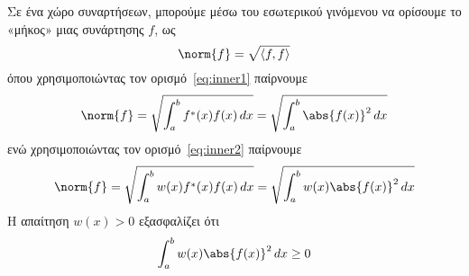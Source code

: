 \begin{rem}
  Σε ένα χώρο συναρτήσεων, μπορούμε μέσω του εσωτερικού γινόμενου να ορίσουμε 
  το «μήκος» μιας συνάρτησης $f$, ως 
  \[
    \norm{f} = \sqrt{\langle f,f \rangle}  
  \] 
  όπου χρησιμοποιώντας τον ορισμό~\eqref{eq:inner1} παίρνουμε
  \[
    \norm{f} = \sqrt{\int _{a}^{b}f^{*}(x)f(x) \,{dx}} = \sqrt{\int _{a}^{b}
    \abs{f(x)}^{2} \,{dx} }  
  \]
  ενώ χρησιμοποιώντας τον ορισμό~\eqref{eq:inner2} παίρνουμε
  \[
    \norm{f} = \sqrt{\int _{a}^{b}w(x)f^{*}(x)f(x) \,{dx}} = \sqrt{\int _{a}^{b}w(x)
    \abs{f(x)}^{2} \,{dx}} 
  \] 
  Η απαίτηση $ w(x)>0 $ εξασφαλίζει ότι 
  \[
    \int _{a}^{b}w(x) \abs{f(x)} ^{2} \,{dx} \geq 0
  \] 
\end{rem}



